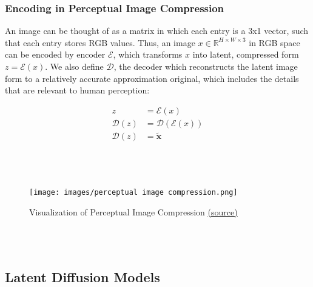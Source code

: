 \documentclass{article}
\begin{document}
\pagebreak

\subsubsection{Encoding in Perceptual Image Compression}
An image can be thought of as a matrix in which each entry is a 3x1 vector, such that each entry stores RGB values. Thus, an image $x \in \mathbb{R}^{H \times W \times 3}$ in RGB space can be encoded by encoder $\mathcal{E}$, which transforms $x$ into latent, compressed form  $z=\mathcal{E}(x)$. We also define $\mathcal{D}$, the decoder which reconstructs the latent image form to a relatively accurate approximation original, which includes the details that are relevant to human perception: \newline

    \begin{align*}
        z & = \mathcal{E}(x) \\
        \mathcal{D}(z) & = \mathcal{D}(\mathcal{E}(x)) \\
        \mathcal{D}(z) & = \tilde{\boldsymbol{x}}
    \end{align*}
\\ \\ \\ 
    \begin{figure}[h]
    \begin{center}
        \centering
        \texttt{[image: images/perceptual image compression.png]}
        \caption{Visualization of Perceptual Image Compression \href{https://tinyurl.com/PICgraphic}{(source)}}
        \label{Perceptual Image Compression}
    \end{center}  
    \end{figure}
\\ \\
\subsection{Latent Diffusion Models}
\end{document}
